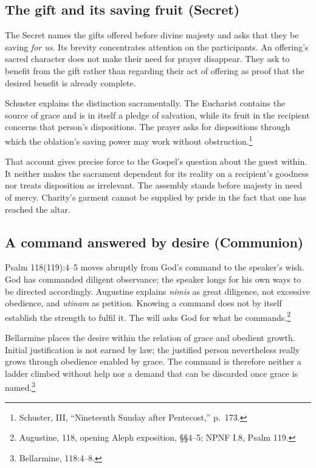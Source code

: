 \subsection{The gift and its saving fruit (Secret)}

The Secret names the gifts offered before divine majesty and asks that
they be saving \emph{for us}. Its brevity concentrates attention on the
participants. An offering's sacred character does not make their need
for prayer disappear. They ask to benefit from the gift rather than
regarding their act of offering as proof that the desired benefit is
already complete.

Schuster explains the distinction sacramentally. The Eucharist contains
the source of grace and is in itself a pledge of salvation, while its
fruit in the recipient concerns that person's dispositions. The prayer
asks for dispositions through which the oblation's saving power may
work without obstruction.\footnote{Schuster,  III,
``Nineteenth Sunday after Pentecost,'' p.~173.}

That account gives precise force to the Gospel's question about the
guest within. It neither makes the sacrament dependent for its reality
on a recipient's goodness nor treats disposition as irrelevant. The
assembly stands before majesty in need of mercy. Charity's garment
cannot be supplied by pride in the fact that one has reached the altar.

\subsection{A command answered by desire (Communion)}

Psalm 118(119):4--5 moves abruptly from God's command to the speaker's
wish. God has commanded diligent observance; the speaker longs for
his own ways to be directed accordingly. Augustine explains
\textit{nimis} as great diligence, not excessive obedience, and
\textit{utinam} as petition. Knowing a command does not by itself
establish the strength to fulfil it. The will asks God for what he
commands.\footnote{Augustine,  118, opening Aleph
exposition, \S\S4--5; NPNF I.8, Psalm 119.}

Bellarmine places the desire within the relation of grace and obedient
growth. Initial justification is not earned by law; the justified
person nevertheless really grows through obedience enabled by grace.
The command is therefore neither a ladder climbed without help nor a
demand that can be discarded once grace is named.\footnote{Bellarmine,
 118:4--8.}

